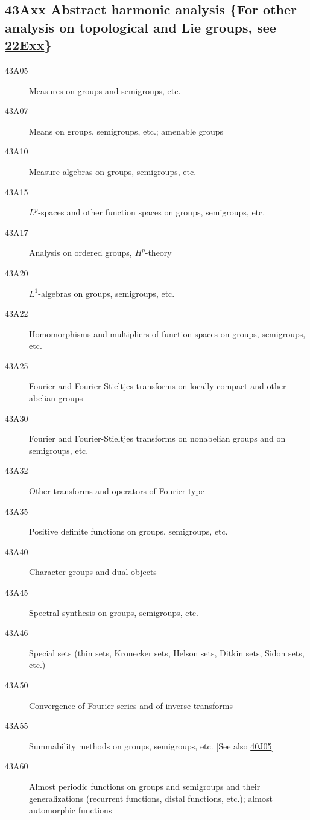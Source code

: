 \documentclass[letterpaper]{article}
\begin{document}
\subsection*{43Axx  Abstract harmonic analysis \{For other analysis on topological and Lie groups, see \hyperref[22Exx]{22Exx}\} }\label{43Axx}
\begin{description}  
\item [43A05]\label{43A05} Measures on groups and semigroups, etc.
\item [43A07]\label{43A07} Means on groups, semigroups, etc.; amenable groups
\item [43A10]\label{43A10} Measure algebras on groups, semigroups, etc.
\item [43A15]\label{43A15} $L^p$-spaces and other function spaces on groups, semigroups, etc.
\item [43A17]\label{43A17} Analysis on ordered groups, $H^p$-theory
\item [43A20]\label{43A20} $L^1$-algebras on groups, semigroups, etc.
\item [43A22]\label{43A22} Homomorphisms and multipliers of function spaces on groups, semigroups, etc.
\item [43A25]\label{43A25} Fourier and Fourier-Stieltjes transforms on locally compact and other abelian groups
\item [43A30]\label{43A30} Fourier and Fourier-Stieltjes transforms on nonabelian groups and on semigroups, etc.
\item [43A32]\label{43A32} Other transforms and operators of Fourier type
\item [43A35]\label{43A35} Positive definite functions on groups, semigroups, etc.
\item [43A40]\label{43A40} Character groups and dual objects
\item [43A45]\label{43A45} Spectral synthesis on groups, semigroups, etc.
\item [43A46]\label{43A46} Special sets (thin sets, Kronecker sets, Helson sets, Ditkin sets, Sidon sets, etc.)
\item [43A50]\label{43A50} Convergence of Fourier series and of inverse transforms
\item [43A55]\label{43A55} Summability methods on groups, semigroups, etc. [See also \hyperref[40J05]{40J05}]
\item [43A60]\label{43A60} Almost periodic functions on groups and semigroups and their generalizations (recurrent functions, distal functions, etc.); almost automorphic functions

\end{description}
\end{document}
